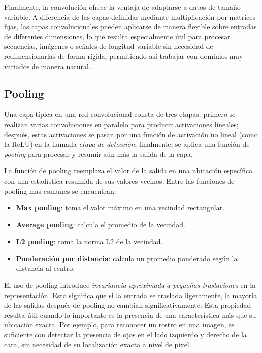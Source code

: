 Finalmente, la convolución ofrece la ventaja de adaptarse a datos de tamaño variable. A diferencia de las capas definidas mediante multiplicación por matrices fijas, las capas convolucionales pueden aplicarse de manera flexible sobre entradas de diferentes dimensiones, lo que resulta especialmente útil para procesar secuencias, imágenes o señales de longitud variable sin necesidad de redimensionarlas de forma rígida, permitiendo así trabajar con dominios muy variados de manera natural.

\subsection{Pooling}
Una capa típica en una red convolucional consta de tres etapas: primero se realizan varias convoluciones en paralelo para producir activaciones lineales; después, estas activaciones se pasan por una función de activación no lineal (como la ReLU) en la llamada \emph{etapa de detección}; finalmente, se aplica una función de \emph{pooling} para procesar y resumir aún más la salida de la capa.

La función de pooling reemplaza el valor de la salida en una ubicación específica con una estadística resumida de sus valores vecinos. Entre las funciones de pooling más comunes se encuentran:

\begin{itemize}
    \item \textbf{Max pooling}: toma el valor máximo en una vecindad rectangular.
    \item \textbf{Average pooling}: calcula el promedio de la vecindad.
    \item \textbf{L2 pooling}: toma la norma L2 de la vecindad.
    \item \textbf{Ponderación por distancia}: calcula un promedio ponderado según la distancia al centro.
\end{itemize}

El uso de pooling introduce \emph{invariancia aproximada a pequeñas traslaciones} en la representación. Esto significa que si la entrada se traslada ligeramente, la mayoría de las salidas después de pooling no cambian significativamente. Esta propiedad resulta útil cuando lo importante es la presencia de una característica más que su ubicación exacta. Por ejemplo, para reconocer un rostro en una imagen, es suficiente con detectar la presencia de ojos en el lado izquierdo y derecho de la cara, sin necesidad de su localización exacta a nivel de píxel.

